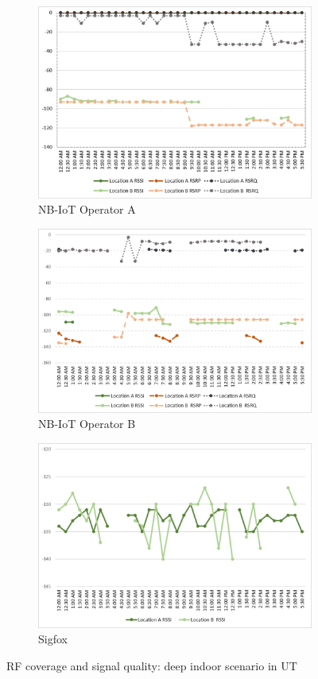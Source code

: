 \documentclass[12pt]{article}
\begin{document}
 \begin{figure}[H]
\begin{subfigure}[t]{\linewidth}
  \centering
  \includegraphics[width=.5\linewidth]{Images/tartu/ATartuDeepIndoor.pdf}  
  \caption{NB-IoT Operator A}
\end{subfigure}
\begin{subfigure}[t]{\linewidth}
  \centering
  \includegraphics[width=.5\linewidth]{Images/tartu/BTartuDeepIndoor.pdf}  
  \caption{NB-IoT Operator B}
  
\end{subfigure}
\begin{subfigure}[t]{\linewidth}
  \centering
  \includegraphics[width=.5\linewidth]{Images/tartu/STartuDeepIndoor.pdf}  
\caption{Sigfox}
 \end{subfigure}
\caption{RF coverage and signal quality: deep indoor scenario in UT}
 \label{RFDeepIndoorTartu}
\end{figure}
\end{document}
